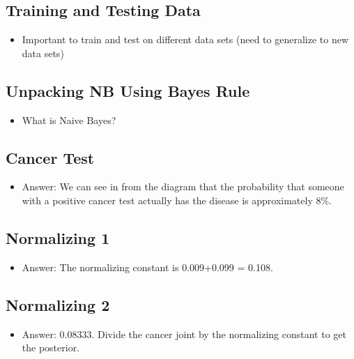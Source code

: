 \documentclass[12pt]{report}
\begin{document}
\subsection{Training and Testing Data}

\begin{itemize}

\item Important to train and test on different data sets (need to generalize to new data sets)

\end{itemize}

\subsection{Unpacking NB Using Bayes Rule}

\begin{itemize}

\item What is Naive Bayes?

\end{itemize}

\subsection{Cancer Test}

\begin{itemize}

\item Answer: We can see in from the diagram that the probability that someone with a positive cancer test actually has the disease is approximately 8\%. 

\end{itemize}

\subsection{Normalizing 1}

\begin{itemize}

\item Answer: The normalizing constant is 0.009+0.099 = 0.108. 

\end{itemize}

\subsection{Normalizing 2}

\begin{itemize}

\item Answer: 0.08333. Divide the cancer joint by the normalizing constant to get the posterior. 

\end{itemize}
\end{document}
